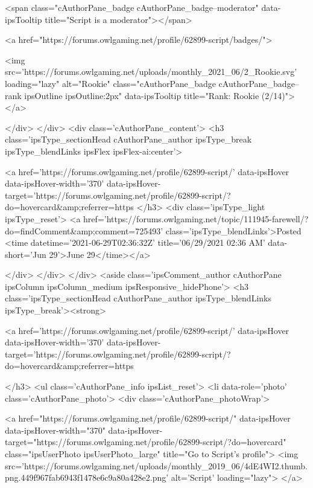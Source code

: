 				
				<span class="cAuthorPane_badge cAuthorPane_badge--moderator" data-ipsTooltip title="Script is a moderator"></span>
				
				
					<a href="https://forums.owlgaming.net/profile/62899-script/badges/">
						
<img src='https://forums.owlgaming.net/uploads/monthly_2021_06/2_Rookie.svg' loading="lazy" alt="Rookie" class="cAuthorPane_badge cAuthorPane_badge--rank ipsOutline ipsOutline:2px" data-ipsTooltip title="Rank: Rookie (2/14)">
					</a>
				
			</div>
		</div>
		<div class='cAuthorPane_content'>
			<h3 class='ipsType_sectionHead cAuthorPane_author ipsType_break ipsType_blendLinks ipsFlex ipsFlex-ai:center'>
				


<a href='https://forums.owlgaming.net/profile/62899-script/' data-ipsHover data-ipsHover-width='370' data-ipsHover-target='https://forums.owlgaming.net/profile/62899-script/?do=hovercard&amp;referrer=https%
			</h3>
			<div class='ipsType_light ipsType_reset'>
				<a href='https://forums.owlgaming.net/topic/111945-farewell/?do=findComment&amp;comment=725493' class='ipsType_blendLinks'>Posted <time datetime='2021-06-29T02:36:32Z' title='06/29/2021 02:36  AM' data-short='Jun 29'>June 29</time></a>
				
			</div>
		</div>
	</div>
	<aside class='ipsComment_author cAuthorPane ipsColumn ipsColumn_medium ipsResponsive_hidePhone'>
		<h3 class='ipsType_sectionHead cAuthorPane_author ipsType_blendLinks ipsType_break'><strong>


<a href='https://forums.owlgaming.net/profile/62899-script/' data-ipsHover data-ipsHover-width='370' data-ipsHover-target='https://forums.owlgaming.net/profile/62899-script/?do=hovercard&amp;referrer=https%
			
		</h3>
		<ul class='cAuthorPane_info ipsList_reset'>
			<li data-role='photo' class='cAuthorPane_photo'>
				<div class='cAuthorPane_photoWrap'>
					


	<a href="https://forums.owlgaming.net/profile/62899-script/" data-ipsHover data-ipsHover-width="370" data-ipsHover-target="https://forums.owlgaming.net/profile/62899-script/?do=hovercard" class="ipsUserPhoto ipsUserPhoto_large" title="Go to Script's profile">
		<img src='https://forums.owlgaming.net/uploads/monthly_2019_06/4dE4WI2.thumb.png.449f967fab6943f1478e6c9a80a428e2.png' alt='Script' loading="lazy">
	</a>

